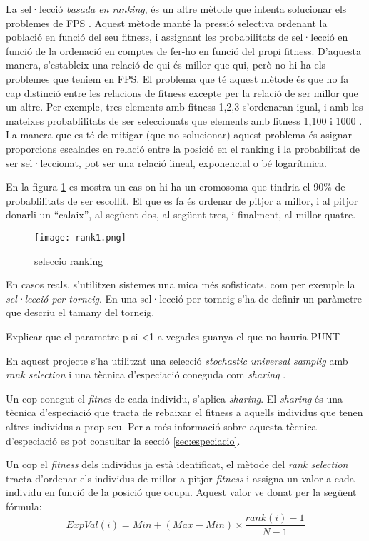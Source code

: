 \documentclass[titlepage,a4paper,12pt]{book}
\begin{document}
La sel·lecció \emph{basada en ranking}, és un altre mètode que intenta
solucionar els problemes de FPS \cite{B87a}.  Aquest mètode manté la pressió
selectiva ordenant la població en funció del seu fitness, i assignant les
probabilitats de sel·lecció en funció de la ordenació en comptes de fer-ho en
funció del propi fitness. D'aquesta manera, s'estableix una relació de qui és
millor que qui, però no hi ha els problemes que teniem en FPS.  El problema que
té aquest mètode és que no fa cap distinció entre les relacions de fitness
excepte per la relació de ser millor que un altre.  Per exemple, tres elements
amb fitness 1,2,3 s'ordenaran igual, i amb les mateixes probablilitats de ser
seleccionats que elements amb fitness 1,100 i 1000 .  La manera que es té de
mitigar (que no solucionar) aquest problema és asignar proporcions escalades en
relació entre la posició en el ranking i la probabilitat de ser sel·leccionat,
pot ser una relació lineal, exponencial o bé logarítmica. 

En la figura \ref{fig:rank1} es mostra  un cas on hi ha un cromosoma que tindria
el 90\% de probablilitats de ser escollit. El que es fa és ordenar de pitjor a
millor, i al pitjor donarli un ``calaix'', al següent dos, al següent tres, i
finalment, al millor quatre. 

\begin{figure} \centering \texttt{[image: rank1.png]}
\caption{\label{fig:rank1}seleccio ranking}
\end{figure}

En casos reals, s'utilitzen sistemes una mica més sofisticats, com per exemple
la \emph{sel·lecció per torneig}.  En una sel·lecció per torneig s'ha de definir
un paràmetre que descriu el tamany del torneig.

Explicar que el parametre p si <1 a vegades guanya el que no hauria
PUNT

En aquest projecte s'ha utilitzat una selecció \emph{stochastic
universal samplig} \cite{B87a} amb \emph{rank selection} \cite{B87b} i una
tècnica d'especiació coneguda com \emph{sharing} \cite{33}.

Un cop conegut el \emph{fitnes} de cada individu, s'aplica \emph{sharing}. El
\emph{sharing} és una tècnica d'especiació que tracta de rebaixar el fitness a
aquells individus que tenen altres individus a prop seu. Per a més informació
sobre aquesta tècnica d'especiació es pot consultar la secció
\ref{sec:especiacio}.

Un cop el \emph{fitness} dels individus ja està identificat, el mètode del
\emph{rank selection} tracta d'ordenar els individus de millor a pitjor
\emph{fitness} i assigna un valor a cada individu en funció de la posició que
ocupa. Aquest valor ve donat per la següent fórmula: \[
ExpVal(i)=Min+(Max-Min)\times \frac{rank(i)-1}{N-1} \]
\end{document}
